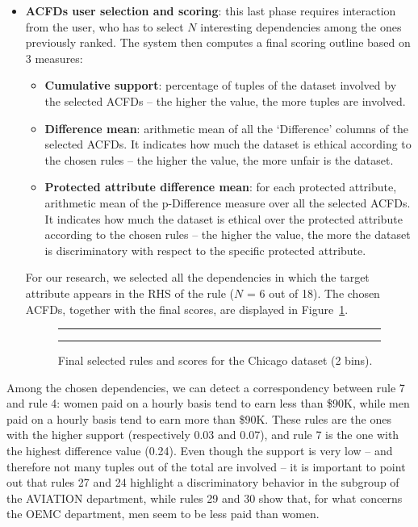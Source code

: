 \begin{itemize}
\item \textbf{ACFDs user selection and scoring}: this last phase requires interaction from the user, who has to select \(N\) interesting dependencies among the ones previously ranked. The system then computes a final scoring outline based on 3 measures:
\begin{itemize}
\item \textbf{Cumulative support}: percentage of tuples of the dataset involved by the selected ACFDs -- the higher the value, the more tuples are involved.
\item \textbf{Difference mean}: arithmetic mean of all the `Difference' columns of the selected ACFDs. It indicates how much the dataset is ethical according to the chosen rules -- the higher the value, the more unfair is the dataset.
\item \textbf{Protected attribute difference mean}: for each protected attribute, arithmetic mean of the p-Difference measure over all the selected ACFDs. It indicates how much the dataset is ethical over the protected attribute according to the chosen rules -- the higher the value, the more the dataset is discriminatory with respect to the specific protected attribute.
\end{itemize}

For our research, we selected all the dependencies in which the target attribute appears in the RHS of the rule (\(N\) = 6 out of 18). The chosen ACFDs, together with the final scores, are displayed in Figure~\ref{fig:chicago_fair-db6}.

\begin{figure}[h!]
\centering
\noindent\rule{\linewidth}{0.4pt}\par
\noindent\rule{\linewidth}{0.4pt}
\caption{Final selected rules and scores for the Chicago dataset (2 bins).}
\label{fig:chicago_fair-db6}
\end{figure}
\end{itemize}

Among the chosen dependencies, we can detect a correspondency between rule 7 and rule 4: women paid on a hourly basis tend to earn less than \$90K, while men paid on a hourly basis tend to earn more than \$90K. These rules are the ones with the higher support (respectively 0.03 and 0.07), and rule 7 is the one with the highest difference value (0.24).
Even though the support is very low -- and therefore not many tuples out of the total are involved -- it is important to point out that rules 27 and 24 highlight a discriminatory behavior in the subgroup of the AVIATION department, while rules 29 and 30 show that, for what concerns the OEMC department, men seem to be less paid than women.

